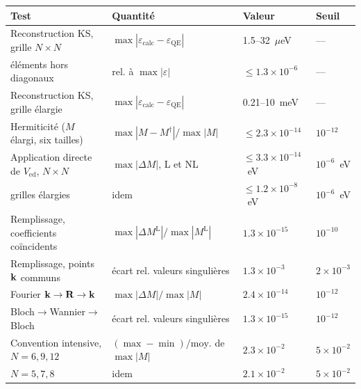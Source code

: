 \begin{tabular}{l l l l}
    \hline\hline
    Test & Quantité & Valeur & Seuil \\
    \hline
    Reconstruction KS, grille $N\times N$             & $\max|\varepsilon_\text{calc}-\varepsilon_\text{QE}|$ & 1.5--32~$\mu$eV            & --- \\
    \quad éléments hors diagonaux                     & rel. à $\max|\varepsilon|$                            & $\le 1.3\times10^{-6}$     & --- \\
    Reconstruction KS, grille élargie                 & $\max|\varepsilon_\text{calc}-\varepsilon_\text{QE}|$ & 0.21--10~meV               & --- \\
    Hermiticité ($M$ élargi, six tailles)             & $\max|M-M^\dagger|/\max|M|$                           & $\le 2.3\times10^{-14}$    & $10^{-12}$ \\
    Application directe de $V_\text{ed}$, $N\times N$ & $\max|\Delta M|$, L et NL                             & $\le 3.3\times10^{-14}$~eV & $10^{-6}$~eV \\
    \quad grilles élargies                            & idem                                                  & $\le 1.2\times10^{-8}$~eV  & $10^{-6}$~eV \\
    Remplissage, coefficients coïncidents             & $\max|\Delta M^\text{L}|/\max|M^\text{L}|$            & $1.3\times10^{-15}$        & $10^{-10}$ \\
    Remplissage, points $\mathbf{k}$ communs                 & écart rel. valeurs singulières                        & $1.3\times10^{-3}$         & $2\times10^{-3}$ \\
    Fourier $\mathbf{k}\to\mathbf{R}\to\mathbf{k}$                         & $\max|\Delta M|/\max|M|$                              & $2.4\times10^{-14}$        & $10^{-12}$ \\
    Bloch$\to$Wannier$\to$Bloch                       & écart rel. valeurs singulières                        & $1.3\times10^{-15}$        & $10^{-12}$ \\
    Convention intensive, $N = 6, 9, 12$              & $(\max-\min)/\text{moy.}$ de $\max|M|$                & $2.3\times10^{-2}$         & $5\times10^{-2}$ \\
    \quad $N = 5, 7, 8$                               & idem                                                  & $2.1\times10^{-2}$         & $5\times10^{-2}$ \\
    \hline\hline
\end{tabular}
